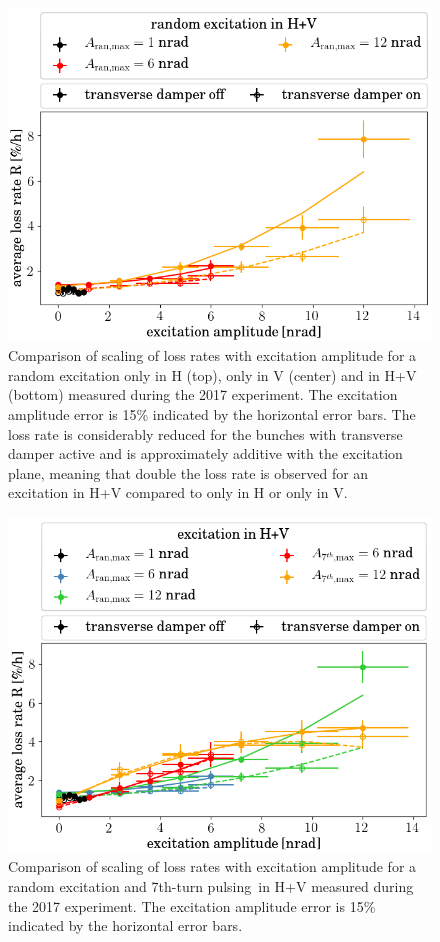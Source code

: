 \documentclass[%
 reprint,
 amsmath,amssymb,
 aps,
prstab,
longbibliography
]{revtex4-1}
\newcommand{\seventhtp}{7th-turn pulsing}
\begin{document}
\begin{figure}
\begin{minipage}[t]{0.32\linewidth}
		\includegraphics[width=1.0\linewidth]{2017_scale_amp_ranhv_lblshort.png}
	\end{minipage}	
	\caption{\label{fig:ranexplossplane} Comparison of scaling of loss rates with excitation amplitude for a random excitation only in H (top), only in V (center) and in H+V (bottom) measured during the 2017 experiment. The excitation amplitude error is 15\% indicated by the horizontal error bars. The loss rate is considerably reduced for the bunches with transverse damper active and is approximately additive with the excitation plane, meaning that double the loss rate is observed for an excitation in H+V compared to only in H or only in V.}
      \end{figure}

\begin{figure}
	\centering
	\includegraphics[width=1.0\linewidth]{2017_scale_amp_7th_ranhv_lblshort.png}
	\caption{\label{fig:ranexploss}  Comparison of scaling of loss rates with excitation amplitude for a random excitation and \seventhtp\ in H+V measured during the 2017 experiment. The excitation amplitude error is 15\% indicated by the horizontal error bars.}
\end{figure}
\end{document}
